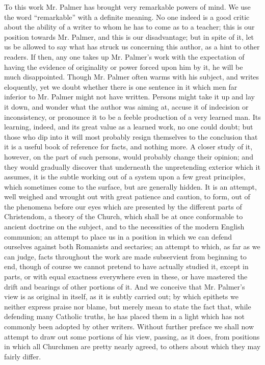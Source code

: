 To this work Mr. Palmer has brought very
remarkable powers of mind. We use the word ``remarkable'' with a
definite meaning. No one indeed is a good critic about the ability of
a writer to whom he has to come as to a teacher; this is our position
towards Mr. Palmer, and this is our disadvantage; but in spite of it,
let us be allowed to say what has struck us concerning this author, as
a hint to other readers. If then, any one takes up Mr. Palmer's work
with the expectation of having the evidence of originality or power
forced upon him by it, he will be much disappointed. Though Mr. Palmer
often warms with his subject, and writes eloquently, yet we doubt
whether there is one sentence in it which men far inferior to Mr.
Palmer might not have written. Persons might take it up and lay it
down, and wonder what the author was aiming at, accuse it of
indecision or inconsistency, or pronounce it to be a feeble production
of a very learned man. Its learning, indeed, and its great value as a
learned work, no one could doubt; but those who dip into it will most
probably resign themselves to the conclusion that it is a useful book
of reference for facts, and nothing more. A closer study of it,
however, on the part of such persons, would probably change
their opinion; and they would gradually discover that underneath the
unpretending exterior which it assumes, it is the subtle working out
of a system upon a few great principles, which sometimes come to the
surface, but are generally hidden. It is an attempt, well weighed and
wrought out with great patience and caution, to form, out of the
phenomena before our eyes which are presented by the different parts
of Christendom, a theory of the Church, which shall be at once
conformable to ancient doctrine on the subject, and to the necessities
of the modern English communion; an attempt to place us in a position
in which we can defend ourselves against both Romanists and sectaries;
an attempt to which, as far as we can judge, facts throughout the work
are made subservient from beginning to end, though of course we cannot
pretend to have actually studied it, except in parts, or with equal
exactness everywhere even in these, or have mastered the drift and
bearings of other portions of it. And we conceive that Mr. Palmer's
view is as original in itself, as it is subtly carried out; by which
epithets we neither express praise nor blame, but merely mean to state
the fact that, while defending many Catholic truths, he has placed
them in a light which has not commonly been adopted by other writers.
Without further preface we shall now attempt to draw out some portions
of his view, passing, as it does, from positions in which all
Churchmen are pretty nearly agreed, to others about which they may
fairly differ.

